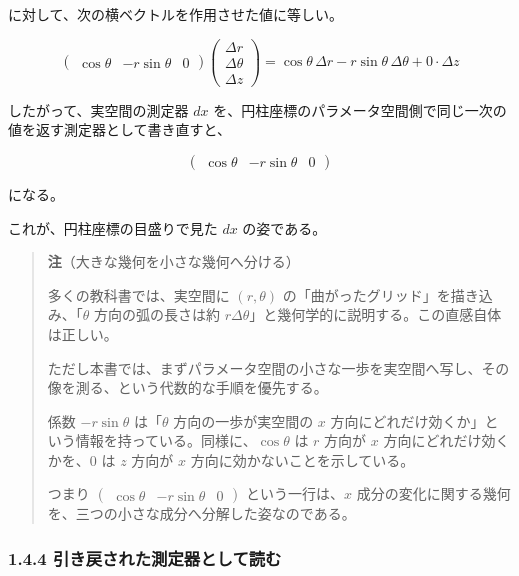 \documentclass[a4paper,12pt,openany]{book}
\begin{document}
に対して、次の横ベクトルを作用させた値に等しい。

\[
\begin{pmatrix}
\cos\theta & -r\sin\theta & 0
\end{pmatrix}
\begin{pmatrix}
\Delta r\\
\Delta\theta\\
\Delta z
\end{pmatrix}
=
\cos\theta\,\Delta r
-r\sin\theta\,\Delta\theta
+0\cdot\Delta z
\]

したがって、実空間の測定器 \(dx\)
を、円柱座標のパラメータ空間側で同じ一次の値を返す測定器として書き直すと、

\[
\begin{pmatrix}
\cos\theta & -r\sin\theta & 0
\end{pmatrix}
\]

になる。

これが、円柱座標の目盛りで見た \(dx\) の姿である。

\begin{quote}
\textbf{注}（大きな幾何を小さな幾何へ分ける）

多くの教科書では、実空間に \((r,\theta)\)
の「曲がったグリッド」を描き込み、「\(\theta\) 方向の弧の長さは約
\(r\Delta\theta\)」と幾何学的に説明する。この直感自体は正しい。

ただし本書では、まずパラメータ空間の小さな一歩を実空間へ写し、その像を測る、という代数的な手順を優先する。

係数 \(-r\sin\theta\) は「\(\theta\) 方向の一歩が実空間の \(x\)
方向にどれだけ効くか」という情報を持っている。同様に、\(\cos\theta\) は
\(r\) 方向が \(x\) 方向にどれだけ効くかを、\(0\) は \(z\) 方向が \(x\)
方向に効かないことを示している。

つまり \(\begin{pmatrix}\cos\theta & -r\sin\theta & 0\end{pmatrix}\)
という一行は、\(x\)
成分の変化に関する幾何を、三つの小さな成分へ分解した姿なのである。
\end{quote}

\hypertarget{ux5f15ux304dux623bux3055ux308cux305fux6e2cux5b9aux5668ux3068ux3057ux3066ux8aadux3080}{%
\subsubsection{1.4.4
引き戻された測定器として読む}\label{ux5f15ux304dux623bux3055ux308cux305fux6e2cux5b9aux5668ux3068ux3057ux3066ux8aadux3080}}
\end{document}
